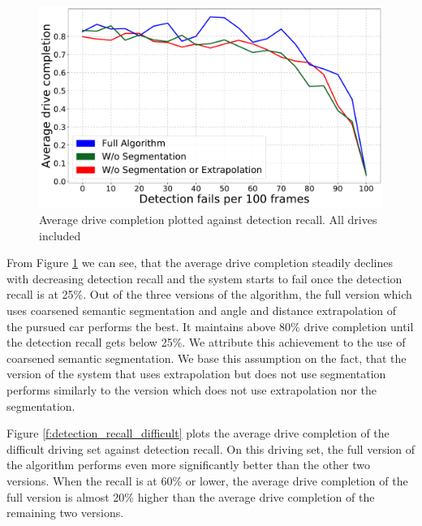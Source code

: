 \documentclass{ctuthesis/ctuthesis}
\begin{document}
\begin{figure}[]
    \centering
    \includegraphics[width=1\textwidth]{images/recall_chart7.pdf}
    
    \caption{Average drive completion plotted against detection recall. All drives included}\label{f:detection_recall}
\end{figure}

From Figure \ref{f:detection_recall} we can see, that the average drive completion steadily declines with decreasing detection recall and the system starts to fail once the detection recall is at 25\%. Out of the three versions of the algorithm, the full version which uses coarsened semantic segmentation and angle and distance extrapolation of the pursued car performs the best. It maintains above 80\% drive completion until the detection recall gets below 25\%. We attribute this achievement to the use of coarsened semantic segmentation. We base this assumption on the fact, that the version of the system that uses extrapolation but does not use segmentation performs similarly to the version which does not use extrapolation nor the segmentation. \par

Figure \ref{f:detection_recall_difficult} plots the average drive completion of the difficult driving set against detection recall. On this driving set, the full version of the algorithm performs even more significantly better than the other two versions. When the recall is at 60\% or lower, the average drive completion of the full version is almost 20\% higher than the average drive completion of the remaining two versions.
\end{document}
